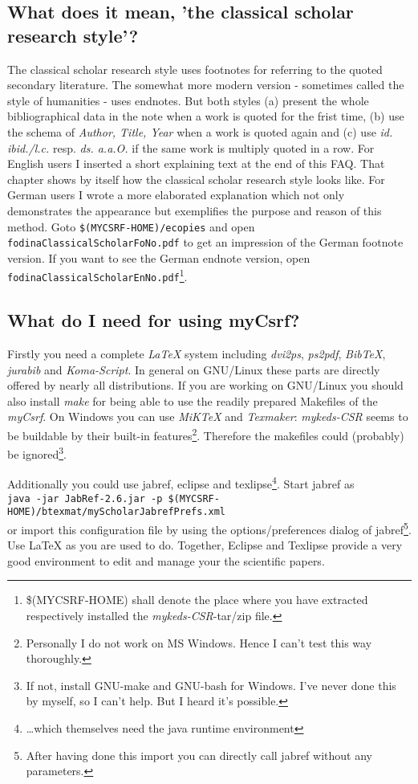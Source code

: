 \documentclass[DIV=calc,BCOR=5mm,11pt,headings=small,oneside,abstract=true, toc=bib]{scrartcl}
\begin{document}
\subsection{What does it mean, 'the classical scholar research style'?}
The classical scholar research style uses footnotes for referring to the quoted
secondary literature. The somewhat more modern version - sometimes called the
style of humanities - uses endnotes. But both styles (a) present the whole
bibliographical data in the note when a work is quoted for the frist time, (b)
use the schema of \textit{Author, Title, Year} when a work is quoted again and
(c) use \textit{id. ibid./l.c.} resp. \textit{ds. a.a.O.} if the same work is
multiply quoted in a row. For English users I inserted a short explaining text
at the end of this FAQ. That chapter shows by itself how the classical scholar
research style looks like. For German users I wrote a more elaborated
explanation which not only demonstrates the appearance but exemplifies the
purpose and reason of this method. Goto \texttt{\$(MYCSRF-HOME)/ecopies}
and open \texttt{fodinaClassicalScholarFoNo.pdf} to get an impression of the
German footnote version. If you want to see the German endnote version, open
\texttt{fodinaClassicalScholarEnNo.pdf}\footnote{\$(MYCSRF-HOME) shall
denote the place where you have extracted respectively installed the
\textit{my\-keds\--CSR}-tar/zip file.}.

\subsection{What do I need for using myCsrf?}
Firstly you need a complete \textit{LaTeX} system including \textit{dvi2ps},
\textit{ps2pdf}, \textit{BibTeX}, \textit{jurabib} and \textit{Koma-Script}. In
general on GNU/Linux these parts are directly offered by nearly all
distributions. If you are working on GNU/Linux you should also install
\textit{make} for being able to use the readily prepared Makefiles of the
\textit{myCsrf}. On Windows you can use \textit{MiKTeX} and
\textit{Texmaker}: \textit{my\-keds-CSR} seems to be buildable by their built-in
features\footnote{Personally I do not work on MS Windows. Hence I can't test
this way thoroughly.}. Therefore the makefiles could (probably) be
ignored\footnote{If not, install GNU-make and GNU-bash for Windows. I've never
done this by myself, so I can't help. But I heard it's possible.}.

Additionally you could use jabref, eclipse and texlipse\footnote{\ldots which
themselves need the java runtime environment}. Start jabref as \\
\texttt{\footnotesize java -jar JabRef-2.6.jar -p
\$(MYCSRF-HOME)/btexmat/myScholarJabrefPrefs.xml}\\
or import this configuration file by using the options/preferences dialog of
jab\-ref\footnote{After having done this import you can directly call jabref
without any parameters.}. Use LaTeX as you are used to do. Together, Eclipse and
Texlipse provide a very good environment to edit and manage your the scientific
papers.
\end{document}
